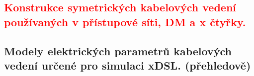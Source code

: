 \subsection{\textcolor{red}{Konstrukce symetrických kabelových vedení používaných v přístupové síti, DM a x čtyřky.}}


\subsection{Modely elektrických parametrů kabelových vedení určené pro simulaci xDSL. (přehledově)}